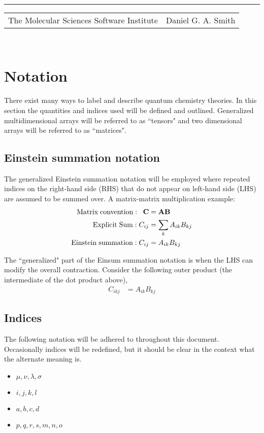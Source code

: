 \documentclass[aip,jcp,preprint,superscriptaddress,floatfix]{revtex4-1}
\renewcommand{\title}[1]{\textbf{\large{#1}}\\}
\newcommand{\leftright}[2]{\begin{tabularx}{\textwidth}{X>{\raggedleft}X}#1%
& #2\\\end{tabularx}\\[-1cm]}
\begin{document}
\title{}
\rule{\textwidth}{1pt}
\leftright{The Molecular Sciences Software Institute}{Daniel G. A. Smith} %

\bigskip

\section{Notation}

There exist many ways to label and describe quantum chemistry theories.
In this section the quantities and indices used will be defined and outlined.
Generalized multidimensional arrays will be referred to as ``tensors" and two dimensional arrays will be referred to as ``matrices".

\subsection{Einstein summation notation}
The generalized Einstein summation notation will be employed where repeated indices on the right-hand side (RHS) that do not appear on left-hand side (LHS) are assumed to be summed over.
A matrix-matrix multiplication example:
\begin{align}
{\rm Matrix\; convention:\; }\;\;\bf{C} &= \bf{A}\bf{B}\\
{\rm Explicit\; Sum:\; }C_{ij} &= \sum_{k} A_{ik} B_{kj}\\
{\rm Einstein\; summation:\;} C_{ij} &= A_{ik} B_{kj}
\end{align}

The ``generalized" part of the Einsum summation notation is when the LHS can modify the overall contraction. Consider the following outer product (the intermediate of the dot product above),
\begin{align}
C_{ikj} &= A_{ik} B_{kj}
\end{align}


\subsection{Indices}
The following notation will be adhered to throughout this document.
Occasionally indices will be redefined, but it should be clear in the context what the alternate meaning is.

\begin{itemize} \itemsep1pt \parskip0pt 
\item {}                        $\mu, \nu, \lambda, \sigma$  
\item {}      $i, j, k, l$
\item {}           $a, b, c, d$
\item {}                   $p, q, r, s, m, n, o$
\end{itemize}
\bigskip
\end{document}
